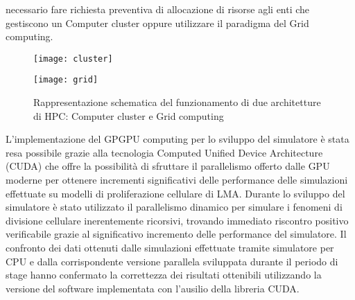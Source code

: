 necessario fare richiesta preventiva di allocazione di risorse agli enti che 
gestiscono un Computer cluster oppure utilizzare il paradigma del Grid 
computing.
\begin{figure}[t]
    \begin{minipage}[b]{.5\linewidth}
        \centering
        \texttt{[image: cluster]}
    \end{minipage}
    \begin{minipage}[b]{.5\linewidth}
        \centering
        \texttt{[image: grid]}
    \end{minipage}
    \caption{Rappresentazione schematica del funzionamento di due architetture 
        di HPC: Computer cluster e Grid computing}
    \label{fig:cluster-grid}
\end{figure}
L'implementazione del GPGPU computing per lo sviluppo del simulatore è stata 
resa possibile grazie alla tecnologia
Computed Unified Device Architecture (CUDA) che offre la possibilità di 
sfruttare il parallelismo offerto dalle GPU moderne per ottenere incrementi 
significativi delle performance delle simulazioni effettuate su modelli di 
proliferazione cellulare di LMA.
Durante lo sviluppo del simulatore è stato utilizzato il 
parallelismo dinamico per simulare i fenomeni 
di divisione cellulare inerentemente ricorsivi, trovando immediato riscontro 
positivo verificabile grazie al significativo incremento delle performance 
del simulatore. Il confronto dei dati ottenuti dalle simulazioni effettuate
tramite simulatore per CPU e dalla corrispondente versione parallela 
sviluppata durante il periodo di stage hanno confermato la correttezza dei
risultati ottenibili utilizzando la versione del software implementata con
l'ausilio della libreria CUDA.

